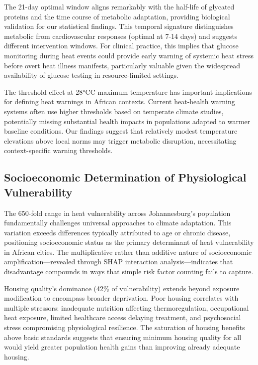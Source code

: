 \documentclass[11pt,a4paper]{article}
\newcommand{\degrees}{°C}
\begin{document}
The 21-day optimal window aligns remarkably with the half-life of glycated proteins and the time course of metabolic adaptation, providing biological validation for our statistical findings. This temporal signature distinguishes metabolic from cardiovascular responses (optimal at 7-14 days) and suggests different intervention windows. For clinical practice, this implies that glucose monitoring during heat events could provide early warning of systemic heat stress before overt heat illness manifests, particularly valuable given the widespread availability of glucose testing in resource-limited settings.

The threshold effect at 28\degrees C maximum temperature has important implications for defining heat warnings in African contexts. Current heat-health warning systems often use higher thresholds based on temperate climate studies, potentially missing substantial health impacts in populations adapted to warmer baseline conditions. Our findings suggest that relatively modest temperature elevations above local norms may trigger metabolic disruption, necessitating context-specific warning thresholds.

\subsection{Socioeconomic Determination of Physiological Vulnerability}

The 650-fold range in heat vulnerability across Johannesburg's population fundamentally challenges universal approaches to climate adaptation. This variation exceeds differences typically attributed to age or chronic disease, positioning socioeconomic status as the primary determinant of heat vulnerability in African cities. The multiplicative rather than additive nature of socioeconomic amplification—revealed through SHAP interaction analysis—indicates that disadvantage compounds in ways that simple risk factor counting fails to capture.

Housing quality's dominance (42\% of vulnerability) extends beyond exposure modification to encompass broader deprivation. Poor housing correlates with multiple stressors: inadequate nutrition affecting thermoregulation, occupational heat exposure, limited healthcare access delaying treatment, and psychosocial stress compromising physiological resilience. The saturation of housing benefits above basic standards suggests that ensuring minimum housing quality for all would yield greater population health gains than improving already adequate housing.
\end{document}

